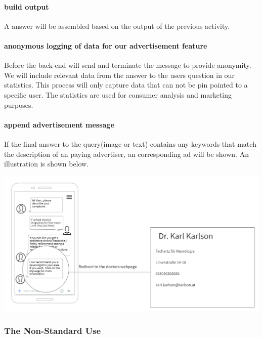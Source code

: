 \paragraph{build output}

A answer will be assembled based on the output of the previous activity.

\paragraph{anonymous logging of data for our advertisement feature}
Before the back-end will send and terminate the message to provide anonymity. We will include relevant data from the answer to the users question in our statistics. This process will only capture data that can not be pin pointed to a specific user. The statistics are used for consumer analysis and marketing purposes.

\paragraph{append advertisement message}

If the final answer to the query(image or text) contains any keywords that match the description of an paying advertiser, an corresponding ad will be shown. \hypertarget{AdIllustration}{An illustration is shown below.}
\begin{center}
    \includegraphics[scale=0.8]{SystemSpec/Usecases/Mocks/advertismentMock.PNG}
\end{center}

\subsubsection{The Non-Standard Use}

